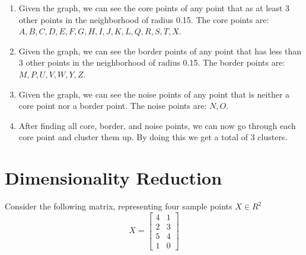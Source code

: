 \documentclass{article}
\begin{document}
\begin{enumerate}[label=(\alph*)]
    \item Given the graph, we can see the core points of any point that as at least 3 other points in the neighborhood of radius 0.15. The core points are: $A, B, C, D, E, F, G, H, I, J, K, L, Q, R, S, T, X$.
    \item Given the graph, we can see the border points of any point that has less than 3 other points in the neighborhood of radius 0.15. The border points are: $M, P, U, V, W, Y, Z$.
    \item Given the graph, we can see the noise points of any point that is neither a core point nor a border point. The noise points are: $N, O$.
    \item After finding all core, border, and noise points, we can now go through each core point and cluster them up. By doing this we get a total of 3 clusters.
\end{enumerate}

\section{Dimensionality Reduction}

Consider the following matrix, representing four sample points $X \in R^2$
\begin{equation*}
    X = \begin{bmatrix}
        4 & 1 \\
        2 & 3 \\
        5 & 4 \\
        1 & 0
    \end{bmatrix}
\end{equation*}
\end{document}
